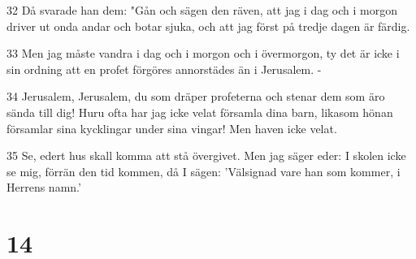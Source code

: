 \par 32 Då svarade han dem: "Gån och sägen den räven, att jag i dag och i morgon driver ut onda andar och botar sjuka, och att jag först på tredje dagen är färdig.
\par 33 Men jag måste vandra i dag och i morgon och i övermorgon, ty det är icke i sin ordning att en profet förgöres annorstädes än i Jerusalem. -
\par 34 Jerusalem, Jerusalem, du som dräper profeterna och stenar dem som äro sända till dig! Huru ofta har jag icke velat församla dina barn, likasom hönan församlar sina kycklingar under sina vingar! Men haven icke velat.
\par 35 Se, edert hus skall komma att stå övergivet. Men jag säger eder: I skolen icke se mig, förrän den tid kommen, då I sägen: 'Välsignad vare han som kommer, i Herrens namn.'

\chapter{14}

